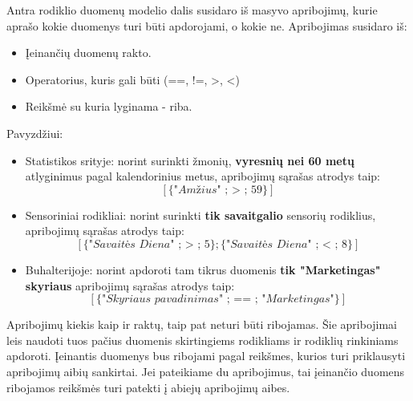 \documentclass{VUMIFPSbakalaurinis}
\begin{document}
Antra rodiklio duomenų modelio dalis susidaro iš masyvo apribojimų, kurie aprašo kokie duomenys turi būti apdorojami, o kokie ne. Apribojimas susidaro iš: 
\begin{itemize}
    \item Įeinančių duomenų rakto.
    \item Operatorius, kuris gali būti (==, !=, >, <)
    \item Reikšmė su kuria lyginama - riba.
\end{itemize}
Pavyzdžiui:
\begin{itemize}
    \item Statistikos srityje: norint surinkti žmonių, \textbf{vyresnių nei 60 metų} atlyginimus pagal kalendorinius metus, apribojimų sąrašas atrodys taip: \[[\{\textit{"Amžius" ; > ; 59}\}]\]
    \item Sensoriniai rodikliai: norint surinkti \textbf{tik savaitgalio} sensorių rodiklius, apribojimų sąrašas atrodys taip: \[[\{\textit{"Savaitės Diena" ; > ; 5}\};\{\textit{"Savaitės Diena" ; < ; 8}\}]\]
    \item Buhalterijoje: norint apdoroti tam tikrus duomenis \textbf{tik "Marketingas" skyriaus} apribojimų sąrašas atrodys taip: \[[\{\textit{"Skyriaus pavadinimas" ; == ; "Marketingas"}\}]\] 
\end{itemize}  
Apribojimų kiekis kaip ir raktų, taip pat neturi būti ribojamas. Šie apribojimai leis naudoti tuos pačius duomenis skirtingiems rodikliams ir rodiklių rinkiniams apdoroti. Įeinantis duomenys bus ribojami pagal reikšmes, kurios turi priklausyti apribojimų aibių sankirtai. Jei pateikiame du apribojimus, tai įeinančio duomens ribojamos reikšmės turi patekti į abiejų apribojimų aibes. 
\par
\end{document}
